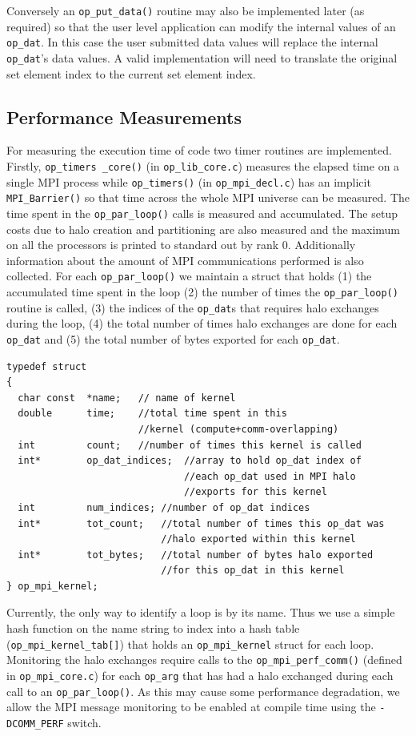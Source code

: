 \documentclass[11pt]{article}
\begin{document}
\noindent Conversely an \texttt{op\_put\_data()} routine may also be implemented later (as required) so that the user
level application can modify the internal values of an \texttt{op\_dat}. In this case the user submitted data values
will replace the internal \texttt{op\_dat}'s data values. A valid implementation will need to translate the original set
element index to the current set element index.


\subsection{Performance Measurements}\label{subsec/perf}

For measuring the execution time of code two timer routines are implemented. Firstly, \texttt{op\_timers \_core()} (in
\texttt{op\_lib\_core.c}) measures the elapsed time on a single MPI process while \texttt{op\_timers()}
(in \texttt{op\_mpi\_decl.c}) has an implicit \texttt{MPI\_Barrier()} so that time across the whole MPI universe can be
measured. \noindent The time spent in the \texttt{op\_par\_loop()} calls is measured and accumulated. The setup costs
due to halo creation and partitioning are also measured and the maximum on all the processors is printed to standard out
by rank 0. Additionally information about the amount of MPI communications performed is also collected. For each
\texttt{op\_par\_loop()} we maintain a struct that holds (1) the accumulated time spent in the loop (2) the number of
times the \texttt{op\_par\_loop()} routine is called, (3) the indices of the \texttt{op\_dat}s that requires halo
exchanges during the loop, (4) the total number of times halo exchanges are done for each \texttt{op\_dat} and (5) the
total number of bytes exported for each \texttt{op\_dat}.
\begin{verbatim}
typedef struct
{
  char const  *name;   // name of kernel
  double      time;    //total time spent in this
                       //kernel (compute+comm-overlapping)
  int         count;   //number of times this kernel is called
  int*        op_dat_indices;  //array to hold op_dat index of
                               //each op_dat used in MPI halo
                               //exports for this kernel
  int         num_indices; //number of op_dat indices
  int*        tot_count;   //total number of times this op_dat was
                           //halo exported within this kernel
  int*        tot_bytes;   //total number of bytes halo exported
                           //for this op_dat in this kernel
} op_mpi_kernel;
\end{verbatim}
\noindent Currently, the only way to identify a loop is by its name. Thus we use
a simple hash function on the name string to index into a hash table
(\texttt{op\_mpi\_kernel\_tab[]}) that holds an \texttt{op\_mpi\_kernel} struct
for each loop. Monitoring the halo exchanges require calls to
the \texttt{op\_mpi\_perf\_comm()} (defined in \texttt{op\_mpi\_core.c}) for
each \texttt{op\_arg} that has had a halo exchanged during each call to an
\texttt{op\_par\_loop()}. As this may cause some performance degradation, we
allow the MPI message monitoring to be enabled at compile time using the
\texttt{-DCOMM\_PERF} switch.
\end{document}
